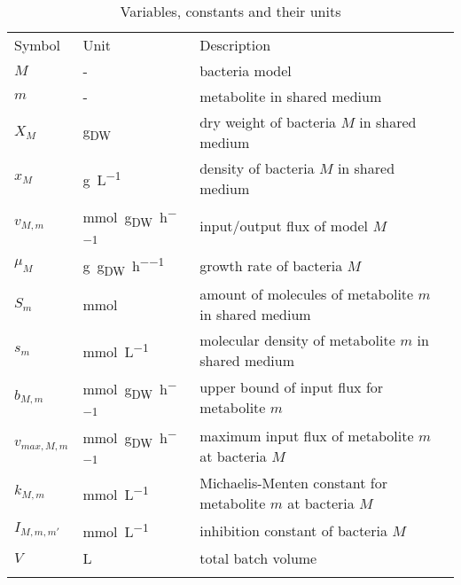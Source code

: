 \section{}
\begin{table*}[H]
\centering
\caption{Variables, constants and their units}
\label{tab:units_of_variables_and_constants}
\begin{tabular}{lll}
\rowcolor[HTML]{EFEFEF} 
Symbol                 & Unit    & Description\\
$M$                    & -       & bacteria model\\
$m$                    & -       & metabolite in shared medium\\
$X_M$                  & \si{\gram_{DW}} & dry weight of bacteria $M$ in shared medium\\
$x_M$                  & \si{\gram\per\liter} & density of bacteria $M$ in shared medium\\
$v_{M,m}$              & \si{\milli\mole\per\gram_{DW}\per\hour} & input/output flux of model $M$\\
$\mu_M$                & \si{\gram\per\gram_{DW}\per\hour} & growth rate of bacteria $M$\\
$S_m$                  & \si{\milli\mole} & amount of molecules of metabolite $m$ in shared medium\\
$s_m$                  & \si{\milli\mole\per\liter} & molecular density of metabolite $m$ in shared medium\\
$b_{M,m}$              & \si{\milli\mole\per\gram_{DW}\per\hour} & upper bound of input flux for metabolite $m$\\
$v_{max,M,m}$          & \si{\milli\mole\per\gram_{DW}\per\hour} & maximum input flux of metabolite $m$ at bacteria $M$\\
$k_{M,m}$              & \si{\milli\mole\per\liter} & Michaelis-Menten constant for metabolite $m$ at bacteria $M$\\
$I_{M,m,m'}$           & \si{\milli\mole\per\liter} & inhibition constant of bacteria $M$\\
$V$                    & \si{\liter} & total batch volume\\
 &&\\

\end{tabular}
\end{table*}

